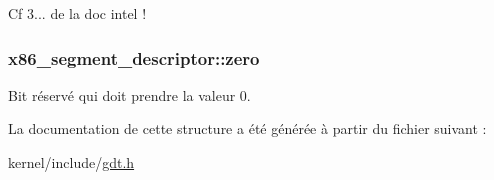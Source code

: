 Cf 3... de la doc intel ! \hypertarget{structx86__segment__descriptor_a4cbd016599f85d6a2060c31d7714dbbd}{
\subsubsection[{zero}]{ x86\+\_\+segment\+\_\+descriptor\+::zero}}\label{structx86__segment__descriptor_a4cbd016599f85d6a2060c31d7714dbbd}
Bit réservé qui doit prendre la valeur 0. 

La documentation de cette structure a été générée à partir du fichier suivant \+:\begin{DoxyCompactItemize}
\item 
kernel/include/\hyperlink{gdt_8h}{gdt.\+h}\end{DoxyCompactItemize}
